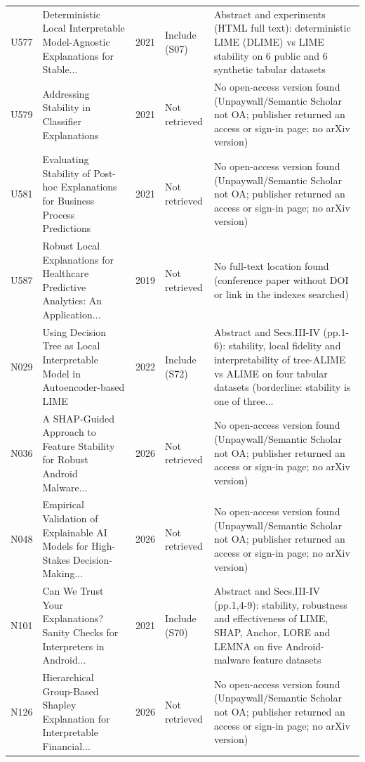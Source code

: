 \begin{longtable}{@{}P{1.0cm}P{6.3cm}P{0.7cm}P{1.6cm}P{6.1cm}@{}}
U577 & Deterministic Local Interpretable Model-Agnostic Explanations for Stable... & 2021 & Include (S07) & Abstract and experiments (HTML full text): deterministic LIME (DLIME) vs LIME stability on 6 public and 6 synthetic tabular datasets \\
U579 & Addressing Stability in Classifier Explanations & 2021 & Not retrieved & No open-access version found (Unpaywall/\allowbreak{}Semantic Scholar not OA; publisher returned an access or sign-in page; no arXiv version) \\
U581 & Evaluating Stability of Post-hoc Explanations for Business Process Predictions & 2021 & Not retrieved & No open-access version found (Unpaywall/\allowbreak{}Semantic Scholar not OA; publisher returned an access or sign-in page; no arXiv version) \\
U587 & Robust Local Explanations for Healthcare Predictive Analytics: An Application... & 2019 & Not retrieved & No full-text location found (conference paper without DOI or link in the indexes searched) \\
N029 & Using Decision Tree as Local Interpretable Model in Autoencoder-based LIME & 2022 & Include (S72) & Abstract and Secs.III-IV (pp.1-6): stability, local fidelity and interpretability of tree-ALIME vs ALIME on four tabular datasets (borderline: stability is one of three... \\
N036 & A SHAP-Guided Approach to Feature Stability for Robust Android Malware... & 2026 & Not retrieved & No open-access version found (Unpaywall/\allowbreak{}Semantic Scholar not OA; publisher returned an access or sign-in page; no arXiv version) \\
N048 & Empirical Validation of Explainable AI Models for High-Stakes Decision-Making... & 2026 & Not retrieved & No open-access version found (Unpaywall/\allowbreak{}Semantic Scholar not OA; publisher returned an access or sign-in page; no arXiv version) \\
N101 & Can We Trust Your Explanations? Sanity Checks for Interpreters in Android... & 2021 & Include (S70) & Abstract and Secs.III-IV (pp.1,4-9): stability, robustness and effectiveness of LIME, SHAP, Anchor, LORE and LEMNA on five Android-malware feature datasets \\
N126 & Hierarchical Group-Based Shapley Explanation for Interpretable Financial... & 2026 & Not retrieved & No open-access version found (Unpaywall/\allowbreak{}Semantic Scholar not OA; publisher returned an access or sign-in page; no arXiv version) \\

\end{longtable}
